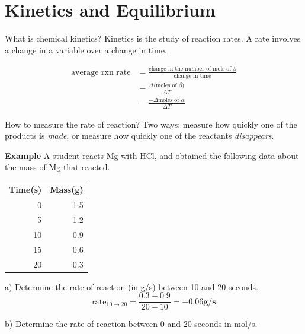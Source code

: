 \documentclass[11pt]{article}
\begin{document}
    \section{Kinetics and Equilibrium}

    What is chemical kinetics? Kinetics is the study of reaction rates. A rate involves a change in a variable over a change in time.

    \begin{equation*}
        \begin{aligned}
            \text{average rxn rate} &= \frac{\text{change in the number of mols of $\beta$}}{\text{change in time}} \\
                                    &= \frac{\Delta \text{(moles of $\beta$)}}{\Delta T} \\
                                    &= \frac{-\Delta \text{moles of $\alpha$}}{\Delta T}
        \end{aligned}
    \end{equation*}

    How to measure the rate of reaction? Two ways: measure how quickly one of the products is \emph{made}, or measure how quickly one of the reactants \emph{disappears}.

    \textbf{Example} A student reacts Mg with HCl, and obtained the following data about the mass of Mg that reacted.

    \begin{center}
        \begin{tabular}{| r | r |}
            \hline
            Time(s) & Mass(g) \\ \hline
            0 & 1.5 \\
            5 & 1.2 \\
            10 & 0.9 \\
            15 & 0.6 \\
            20 & 0.3 \\ \hline
        \end{tabular}
    \end{center}

    a) Determine the rate of reaction (in g/s) between 10 and 20 seconds. \\
    
    \begin{equation*}
        \text{rate}_{10 \rightarrow 20} = \frac{0.3-0.9}{20-10} = -0.06\textbf{g/s}
    \end{equation*}

    b) Determine the rate of reaction between 0 and 20 seconds in mol/s.
\end{document}
